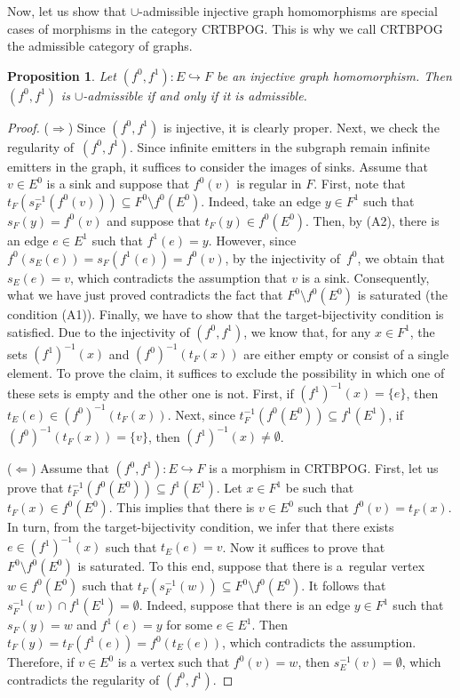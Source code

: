 \documentclass[12pt,times,a4paper]{amsart}
\newtheorem{proposition}[theorem]{Proposition}
\numberwithin{equation}{section}
\numberwithin{equation}{section}
\begin{document}
Now, let us show that $\cup$-admissible injective graph homomorphisms are special cases of morphisms in the category CRTBPOG. 
This is why we call CRTBPOG 
the admissible category of graphs.
\begin{proposition}
Let $(f^0,f^1):E\hookrightarrow F$ be an injective graph homomorphism. 
Then $(f^0,f^1)$ is $\cup$-admissible if and only if it is admissible.
\end{proposition}
\begin{proof}
($\Rightarrow$) Since $(f^0,f^1)$ is injective, it is clearly proper. Next, we check the regularity of~$(f^0,f^1)$.
Since infinite emitters in the subgraph remain infinite emitters in the graph, it suffices to consider the images of sinks. 
Assume that $v\in E^0$ is a sink 
and suppose that $f^0(v)$ is 
regular in $F$. First, note that $t_F(s^{-1}_F(f^0(v)))\subseteq F^0\setminus f^0(E^0)$.
Indeed, take an edge $y\in F^1$ such that $s_F(y)=f^0(v)$ and suppose that $t_F(y)\in f^0(E^0)$. Then, by (A2), there is an edge 
$e\in E^1$ such that $f^1(e)=y$. However, since $f^0(s_E(e))=s_F(f^1(e))=f^0(v)$, by the injectivity of~$f^0$, we obtain that 
$s_E(e)=v$, which contradicts the assumption that $v$ is a sink. Consequently, what we have just proved 
contradicts the fact that $F^0\setminus f^0(E^0)$ is saturated (the condition (A1)). Finally, we 
have to show that the target-bijectivity condition is satisfied.
Due to the injectivity of $(f^0,f^1)$, we know that, for any $x\in F^1$, the sets $(f^1)^{-1}(x)$ and $(f^0)^{-1}(t_F(x))$ are either 
empty or consist of a single element. To prove the claim, it suffices to exclude the possibility in which one of these sets is empty and 
the other one is not. First, if $(f^1)^{-1}(x)=\{e\}$, then $t_E(e)\in(f^0)^{-1}(t_F(x))$. Next, since 
$t_F^{-1}(f^0(E^0))\subseteq f^1(E^1)$, if $(f^0)^{-1}(t_F(x))=\{v\}$, then $(f^1)^{-1}(x)\neq\emptyset$.

($\Leftarrow$) Assume that $(f^0,f^1):E\hookrightarrow F$ is a morphism in CRTBPOG. First, let us prove that 
$t_F^{-1}(f^0(E^0))\subseteq f^1(E^1)$. Let $x\in F^1$ be such that $t_F(x)\in f^0(E^0)$. This implies that there is $v\in E^0$ 
such that $f^0(v)=t_F(x)$. In turn, from the target-bijectivity condition, we infer that there exists $e\in (f^1)^{-1}(x)$ such that 
$t_E(e)=v$. Now it suffices to prove that \mbox{$F^0\setminus f^0(E^0)$} is saturated. 
To this end, suppose that there is a~regular vertex 
$w\in f^0(E^0)$ such that $t_F(s^{-1}_F(w))\subseteq F^0\setminus f^0(E^0)$. It follows that 
$s^{-1}_F(w)\cap f^1(E^1)=\emptyset$. Indeed, suppose that there is an edge $y\in F^1$ such that $s_F(y)=w$ and $f^1(e)=y$
 for some $e\in E^1$. Then $t_F(y)=t_F(f^1(e))=f^0(t_E(e))$, which contradicts the assumption. Therefore, if $v\in E^0$ is 
a vertex such that $f^0(v)=w$, then  $s^{-1}_E(v)=\emptyset$, which contradicts the regularity of $(f^0,f^1)$.
\end{proof}
\end{document}
